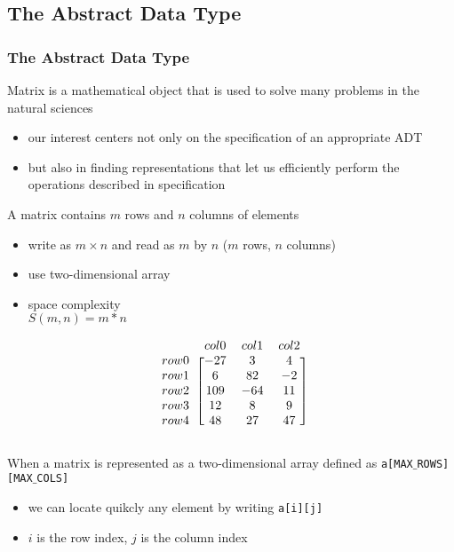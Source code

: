 \documentclass[newPxFont,sthlmFooter,nooffset]{beamer}
\begin{document}
\subsection{The Abstract Data Type}
\begin{frame}
	\frametitle{The Abstract Data Type}
Matrix is a mathematical object that is used to solve many problems in the natural sciences
\begin{itemize}
  \item our interest centers not only on the specification of an appropriate ADT
  \item but also in finding representations that let us efficiently perform the operations described in specification
\end{itemize}	

\framebreak
A matrix contains $m$ rows and $n$ columns of elements 

\begin{itemize}
  \item write as $m \times n$ and read as $m$ by $n$ ($m$ rows, $n$ columns)
  \item use two-dimensional array
  \item space complexity \\
        $S(m, n) = m *n$
  \end{itemize}

\begin{equation*}
  \begin{blockarray}{r *{3}{c}}
      & col0 & col1 & col2 \\
\begin{block}{l [*{3}{c}]}
 row0 & -27  &   3  &  4   \\
 row1 &   6  &  82  &  -2  \\
 row2 & 109  & -64  &  11   \\
 row3 &  12  &   8  &  9   \\
 row4 &  48  &  27  & 47   \\
\end{block}
  \end{blockarray}
\end{equation*}

\framebreak

When a matrix is represented as a two-dimensional array defined as \texttt{a[MAX$\_$ROWS][MAX$\_$COLS]}
\begin{itemize}
  \item we can locate quikcly any element by writing \texttt{a[i][j]}
  \item $i$ is the row index, $j$ is the column index
\end{itemize}


\end{frame}
\end{document}
